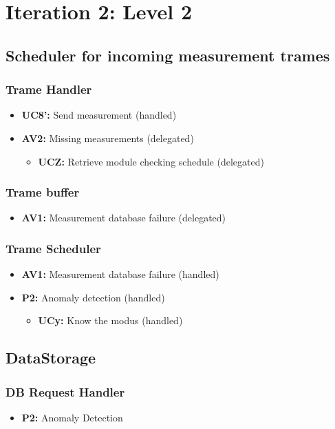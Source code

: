 \section{Iteration 2: Level 2}
\subsection{Scheduler for incoming measurement trames}
\subsubsection{Trame Handler}
\begin{itemize}
	\item \textbf{UC8': } Send measurement (handled)
	\item \textbf{AV2: } Missing measurements (delegated)
	\begin{itemize}
		\item \textbf{UCZ: } Retrieve module checking schedule (delegated)
	\end{itemize}
\end{itemize}
\subsubsection{Trame buffer}
\begin{itemize}
	\item \textbf{AV1: } Measurement database failure (delegated)
\end{itemize}
\subsubsection{Trame Scheduler}
\begin{itemize}
	\item \textbf{AV1: } Measurement database failure (handled)
	\item \textbf{P2: } Anomaly detection (handled)
	\begin{itemize}
		\item \textbf{UCy: } Know the modus (handled)
	\end{itemize}
\end{itemize}

\subsection{DataStorage}
\subsubsection{DB Request Handler}
\begin{itemize}
	\item \textbf{P2:  } Anomaly Detection 
\end{itemize}
